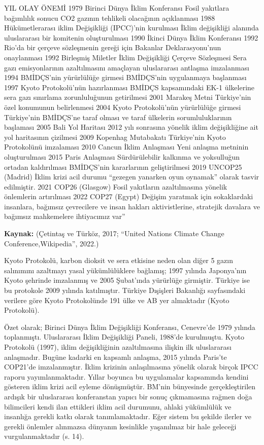\documentclass[
]{book}
\begin{document}
YIL OLAY ÖNEMİ
1979 Birinci Dünya İklim Konferansı Fosil yakıtlara bağımlılık sonucu
CO2 gazının tehlikeli olacağının açıklanması
1988 Hükümetlerarası iklim Değişikliği
(IPCC)'nin kurulması İklim değişikliği alanında
uluslararası bir komitenin oluşturulması
1990 İkinci Dünya İklim Konferansı 1992 Rio'da bir çerçeve sözleşmenin gereği için
Bakanlar Deklarasyonu'nun onaylanması
1992 Birleşmiş Miletler İklim Değişikliği
Çerçeve Sözleşmesi Sera gazı emisyonlarının azaltılmasını amaçlayan
uluslararası antlaşma imzalanması
1994 BMİDÇS'nin yürürlülüğe girmesi BMİDÇS'nin uygulanmaya başlanması
1997 Kyoto Protokolü'nün hazırlanması BMİDÇS kapsamındaki EK-1 ülkelerine
sera gazı sınırlama zorunluluğunun getirilmesi
2001 Marakeş Metni Türkiye'nin özel konumunun belirlenmesi
2004 Kyoto Protokolü'nün yürürlülüğe girmesi Türkiye'nin BMİDÇS'ne taraf olması ve
taraf ülkelerin sorumluluklarının başlaması
2005 Bali Yol Haritası 2012 yılı sonrasına yönelik iklim değişikliğine ait
yol haritasının çizilmesi
2009 Kopenhag Mutabakatı Türkiye'nin Kyoto Protokolünü imzalaması
2010 Cancun İklim Anlaşması Yeni anlaşma metninin oluşturulması
2015 Paris Anlaşması Sürdürülebilir kalkınma ve yoksulluğun ortadan
kaldırılması BMİDÇS'nin kararlarının geliştirilmesi
2019 UNCOP25 (Madrid) İklim krizi acil durumu ``gezegen yanarken oyun
oynamak'' olarak tasvir edilmiştir.
2021 COP26 (Glasgow) Fosil yakıtların azaltılmasına yönelik önlemlerin
artırılması
2022 COP27 (Egypt) Değişim yaratmak için sokaklardaki insanlara, bağımsız çevrecilere ve insan hakları aktivistlerine, stratejik davalara ve bağımsız mahkemelere ihtiyacımız var''

\textbf{Kaynak:} (Çetintaş ve Türköz, 2017; ``United Nations Climate Change Conference,Wikipedia'', 2022.)

Kyoto Protokolü, karbon dioksit ve sera etkisine neden olan diğer 5 gazın salınımını azaltmayı yasal yükümlülüklere bağlamış; 1997 yılında Japonya'nın Kyoto şehrinde imzalanmış ve 2005 Şubat'ında yürürlüğe girmiştir. Türkiye ise bu protokole 2009 yılında katılmıştır. Türkiye Dışişleri Bakanlığı sayfasındaki verilere göre Kyoto Protokolünde 191 ülke ve AB yer almaktadır (Kyoto Protokolü). \citep{kyoto2019kyoto}

Özet olarak; Birinci Dünya İklim Değişikliği Konferansı, Cenevre'de 1979 yılında toplanmıştı. Uluslararası İklim Değişikliği Paneli, 1988'de kurulmuştu. Kyoto Protokolü (1997), iklim değişikliğinin azaltılmasına ilişkin ilk uluslararası anlaşmadır. Bugüne kadarki en kapsamlı anlaşma, 2015 yılında Paris'te COP21'de imzalanmıştır. İklim krizinin anlaşılmasına yönelik olarak birçok IPCC raporu yayımlanmaktadır. Yıllar boyunca bu uygulamalar kapsamında kendini gösteren iklim krizi acil eyleme dönüşmüştür. BM'nin bünyesinde gerçekleştirilen ardışık bir uluslararası konferanstan yapıcı bir sonuç çıkmamasına rağmen doğa bilimcileri kendi ilan ettikleri iklim acil durumunu, ahlaki yükümlülük ve insanlığa gerekli katkı olarak tanımlamaktadır. Eğer sistem bu şekilde ilerler ve gerekli önlemler alınmazsa dünyanın kesinlikle yaşanılmaz bir hale geleceği vurgulanmaktadır (s. 14).\citep{harvey2016climate}
\end{document}
